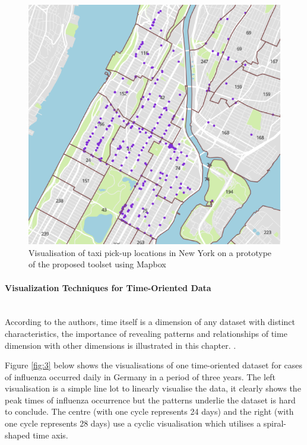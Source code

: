 \documentclass[doc,natbib]{apa6}
\begin{document}
\begin{figure}[H]
	\centering
	\includegraphics{figures/fig2.png}
	\caption{\label{fig:2}Visualisation of taxi pick-up locations in New York on a prototype of the proposed toolset using Mapbox \citep{Mapbox2017}}
\end{figure}

\paragraph{Visualization Techniques for Time-Oriented Data}\label{par:Visualization Techniques for Time-Oriented Data}\hfill\\
According to the authors, time itself is a dimension of any dataset with distinct characteristics, the importance of revealing patterns and relationships of time dimension with other dimensions is illustrated in this chapter. \citep[p. 254]{Ward2010}.

Figure \ref{fig:3} below shows the visualisations of one time-oriented dataset for cases of influenza occurred daily in Germany in a period of three years. The left visualisation is a simple line lot to linearly visualise the data, it clearly shows the peak times of influenza occurrence but the patterns underlie the dataset is hard to conclude. The centre (with one cycle represents 24 days) and the right (with one cycle represents 28 days) use a cyclic visualisation which utilises a spiral-shaped time axis. 
\end{document}
